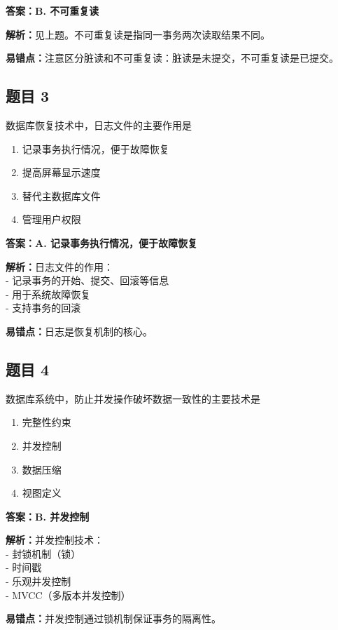 \documentclass[12pt,a4paper]{ctexart}
\begin{document}
\begin{answerbox}
	\textbf{答案：B. 不可重复读}

	\textbf{解析：}见上题。不可重复读是指同一事务两次读取结果不同。

	\textbf{易错点：}注意区分脏读和不可重复读：脏读是未提交，不可重复读是已提交。
\end{answerbox}

\subsection*{题目 3}
数据库恢复技术中，日志文件的主要作用是
\begin{enumerate}[label=\Alph*.]
	\item 记录事务执行情况，便于故障恢复
	\item 提高屏幕显示速度
	\item 替代主数据库文件
	\item 管理用户权限
\end{enumerate}

\begin{answerbox}
	\textbf{答案：A. 记录事务执行情况，便于故障恢复}

	\textbf{解析：}日志文件的作用：\\
	- 记录事务的开始、提交、回滚等信息\\
	- 用于系统故障恢复\\
	- 支持事务的回滚

	\textbf{易错点：}日志是恢复机制的核心。
\end{answerbox}

\subsection*{题目 4}
数据库系统中，防止并发操作破坏数据一致性的主要技术是
\begin{enumerate}[label=\Alph*.]
	\item 完整性约束
	\item 并发控制
	\item 数据压缩
	\item 视图定义
\end{enumerate}

\begin{answerbox}
	\textbf{答案：B. 并发控制}

	\textbf{解析：}并发控制技术：\\
	- 封锁机制（锁）\\
	- 时间戳\\
	- 乐观并发控制\\
	- MVCC（多版本并发控制）

	\textbf{易错点：}并发控制通过锁机制保证事务的隔离性。
\end{answerbox}
\end{document}
